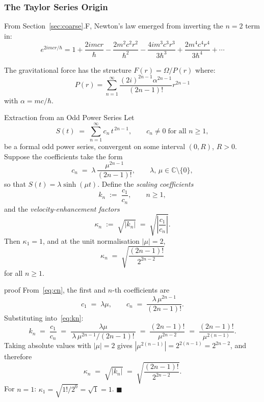 \documentclass[11pt,a4paper]{article}
\theoremstyle{definition}
\theoremstyle{remark}
\begin{document}
	\subsubsection{The Taylor Series Origin}
	
	From Section~\ref{sec:coarse}.F, Newton's law emerged from inverting the $n=2$ term in:
	\begin{equation}
		e^{2imcr/\hbar} = 1 + \frac{2imcr}{\hbar} - \frac{2m^2c^2r^2}{\hbar^2} - \frac{4im^3c^3r^3}{3\hbar^3} + \frac{2m^4c^4r^4}{3\hbar^4} + \cdots
		\label{eq:taylor_series}
	\end{equation}
	
	The gravitational force has the structure $F(r) = \Omega/P(r)$ where:
	\begin{equation}
		P(r) = \sum_{n=1}^{\infty} \frac{(2i)^{2n-1} \alpha^{2n-1}}{(2n-1)!} r^{2n-1}
		\label{eq:P_series}
	\end{equation}
	with $\alpha = mc/\hbar$.
	
	Extraction from an Odd Power Series
		Let
		\[
		S(t) \;=\; \sum_{n=1}^{\infty} c_n\, t^{\,2n-1}, \qquad c_n \neq 0 \;\text{for all } n \geq 1,
		\]
		be a formal odd power series, convergent on some interval $(0,R)$, $R>0$.
		Suppose the coefficients take the form
		\begin{equation}
			c_n \;=\; \lambda\,\frac{\mu^{2n-1}}{(2n-1)!}, \qquad \lambda,\,\mu \in \mathbb{C}\setminus\{0\},
			\label{eq:cn}
		\end{equation}
		so that $S(t) = \lambda\sinh(\mu t)$.
		Define the \emph{scaling coefficients}
		\begin{equation}
			k_n \;:=\; \frac{c_1}{c_n}, \qquad n \geq 1,
			\label{eq:kn}
		\end{equation}
		and the \emph{velocity-enhancement factors}
		\begin{equation}
			\kappa_n \;:=\; \sqrt{|k_n|} \;=\; \sqrt{\left|\frac{c_1}{c_n}\right|}.
			\label{eq:kappa_def}
		\end{equation}
		Then $\kappa_1 = 1$, and at the unit normalisation $|\mu| = 2$,
		\begin{equation}
			\boxed{\kappa_n \;=\; \sqrt{\dfrac{(2n-1)!}{2^{2n-2}}}}
			\label{eq:kappa_formula}
		\end{equation}
		for all $n \geq 1$.
	
	proof
		From~\eqref{eq:cn}, the first and $n$-th coefficients are
		\[
		c_1 \;=\; \lambda\mu, \qquad
		c_n \;=\; \frac{\lambda\,\mu^{2n-1}}{(2n-1)!}.
		\]
		Substituting into~\eqref{eq:kn}:
		\[
		k_n \;=\; \frac{c_1}{c_n}
		\;=\; \frac{\lambda\mu}{\,\lambda\,\mu^{2n-1}/(2n-1)!\,}
		\;=\; \frac{(2n-1)!}{\mu^{2n-2}}
		\;=\; \frac{(2n-1)!}{\mu^{2(n-1)}}.
		\]
		Taking absolute values with $|\mu|=2$ gives $|\mu^{2(n-1)}| = 2^{2(n-1)} = 2^{2n-2}$, and
		therefore
		\[
		\kappa_n \;=\; \sqrt{|k_n|} \;=\; \sqrt{\frac{(2n-1)!}{2^{2n-2}}}.
		\]
		For $n=1$: $\kappa_1 = \sqrt{1!/2^{0}} = \sqrt{1} = 1$. \hfill$\blacksquare$
	
\end{document}
